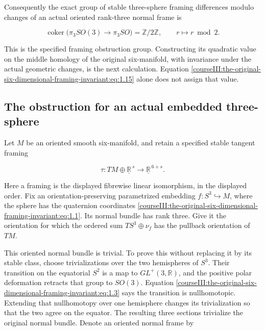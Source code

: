 Consequently the exact group of stable three-sphere framing differences modulo changes of an actual oriented rank-three normal frame is

\begin{equation}
\operatorname{coker}\bigl(\pi_3SO(3)\to\pi_3SO\bigr)
 =\mathbb Z/2\mathbb Z,
 \qquad r\longmapsto r\bmod2.
 \label{courseIII:the-original-six-dimensional-framing-invariant:eq:1.15}
\end{equation}

This is the specified framing obstruction group. Constructing its quadratic value on the middle homology of the original six-manifold, with invariance under the actual geometric changes, is the next calculation. Equation \eqref{courseIII:the-original-six-dimensional-framing-invariant:eq:1.15} alone does not assign that value.

\subsection{The obstruction for an actual embedded three-sphere}
\label{courseIII:the-original-six-dimensional-framing-invariant:framed-six-embedded-obstruction}

\label{courseIII:the-original-six-dimensional-framing-invariant:section-2}\label{courseIII:framed6:2}

Let \(M\) be an oriented smooth six-manifold, and retain a specified stable tangent framing

\begin{equation}
\tau:TM\oplus\underline{\mathbb R}^{\,s}
       \longrightarrow\underline{\mathbb R}^{\,6+s}.
 \label{courseIII:the-original-six-dimensional-framing-invariant:eq:2.1}
\end{equation}

Here a framing is the displayed fibrewise linear isomorphism, in the displayed order. Fix an orientation-preserving parametrized embedding \(f:S^3\hookrightarrow M\), where the sphere has the quaternion coordinates \eqref{courseIII:the-original-six-dimensional-framing-invariant:eq:1.1}. Its normal bundle has rank three. Give it the orientation for which the ordered sum \(TS^3\oplus\nu_f\) has the pullback orientation of \(TM\).

This oriented normal bundle is trivial. To prove this without replacing it by its stable class, choose trivializations over the two hemispheres of \(S^3\). Their transition on the equatorial \(S^2\) is a map to \(GL^+(3,\mathbb R)\), and the positive polar deformation retracts that group to \(SO(3)\). Equation \eqref{courseIII:the-original-six-dimensional-framing-invariant:eq:1.3} says the transition is nullhomotopic. Extending that nullhomotopy over one hemisphere changes its trivialization so that the two agree on the equator. The resulting three sections trivialize the original normal bundle. Denote an oriented normal frame by

